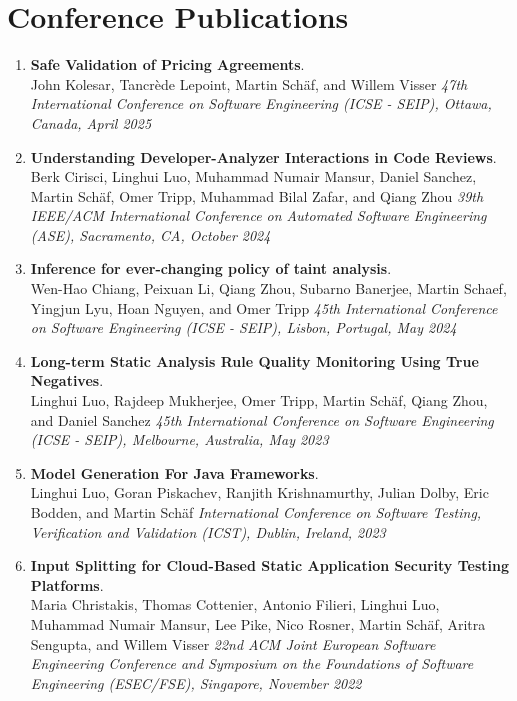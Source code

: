 \section{\sc Conference Publications}


\begin{enumerate}

  \item \textbf{Safe Validation of Pricing Agreements}.
  \\  John Kolesar, Tancrède Lepoint, Martin Schäf, and Willem Visser
  \emph{47th International Conference on Software Engineering (ICSE - SEIP), Ottawa, Canada, April 2025}

  \item \textbf{Understanding Developer-Analyzer Interactions in Code Reviews}.
  \\  Berk Cirisci, Linghui Luo, Muhammad Numair Mansur, Daniel Sanchez, Martin Schäf, Omer Tripp, Muhammad Bilal Zafar, and Qiang Zhou
  \emph{39th IEEE/ACM International Conference on Automated Software Engineering (ASE), Sacramento, CA, October 2024}

  \item \textbf{Inference for ever-changing policy of taint analysis}.
  \\  Wen-Hao Chiang, Peixuan Li, Qiang Zhou, Subarno Banerjee, Martin Schaef, Yingjun Lyu, Hoan Nguyen, and Omer Tripp
  \emph{45th International Conference on Software Engineering (ICSE - SEIP), Lisbon, Portugal, May 2024}

  \item \textbf{Long-term Static Analysis Rule Quality Monitoring Using True Negatives}.
  \\  Linghui Luo, Rajdeep Mukherjee, Omer Tripp, Martin Schäf, Qiang Zhou, and Daniel Sanchez
  \emph{45th International Conference on Software Engineering (ICSE - SEIP), Melbourne, Australia, May 2023}

  \item \textbf{Model Generation For Java Frameworks}.
  \\  Linghui Luo, Goran Piskachev, Ranjith Krishnamurthy, Julian Dolby, Eric Bodden, and Martin Schäf
  \emph{International Conference on Software Testing, Verification and Validation (ICST), Dublin, Ireland, 2023}

  \item \textbf{Input Splitting for Cloud-Based Static Application Security Testing Platforms}.
  \\  Maria Christakis, Thomas Cottenier, Antonio Filieri, Linghui Luo, Muhammad Numair Mansur, Lee Pike, Nico Rosner, Martin Schäf, Aritra Sengupta, and Willem Visser
  \emph{22nd ACM Joint European Software Engineering Conference and Symposium on the Foundations of Software Engineering (ESEC/FSE), Singapore, November 2022}


\end{enumerate}
